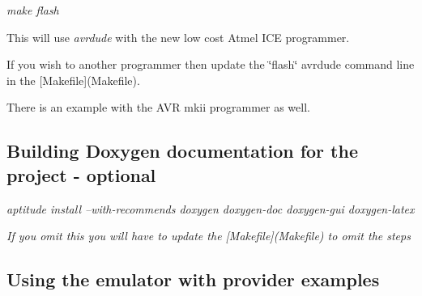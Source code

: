 \begin{DoxyItemize}
\item {\itshape make flash}
\begin{DoxyItemize}
\item This will use {\itshape avrdude} with the new low cost Atmel I\+CE programmer.
\begin{DoxyItemize}
\item If you wish to another programmer then update the \char`\"{}flash\char`\"{} avrdude command line in the \mbox{[}Makefile\mbox{]}(Makefile).
\item There is an example with the A\+VR mkii programmer as well.
\end{DoxyItemize}
\end{DoxyItemize}
\end{DoxyItemize}

\subsection*{Building Doxygen documentation for the project -\/ optional}


\begin{DoxyItemize}
\item {\itshape aptitude install --with-\/recommends doxygen doxygen-\/doc doxygen-\/gui doxygen-\/latex}
\item {\itshape If you omit this you will have to update the \mbox{[}Makefile\mbox{]}(Makefile) to omit the steps} 


\end{DoxyItemize}

\subsection*{Using the emulator with provider examples}


